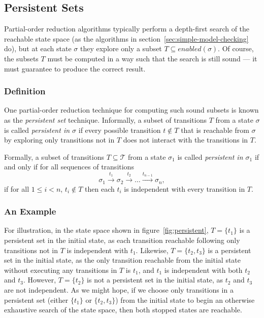 \documentclass[12pt,a4paper,twoside,openright]{report}
\begin{document}
\subsection{Persistent Sets}
\label{sec:persistent}

Partial-order reduction algorithms typically 
perform a depth-first
search of the reachable state space
(as the algorithms in
section~\ref{sec:simple-model-checking} do), but at each
state $\sigma$ they explore only a subset
$T \subseteq \textit{enabled}(\sigma)$. Of course, the subsets
$T$ must be computed in a way such that the search
is still sound --- it must guarantee to
produce the correct result.

\subsubsection{Definition}
One partial-order reduction technique for
computing such sound subsets is known
as the \emph{persistent set} technique. Informally,
a subset of transitions $T$ from a state $\sigma$
is called \emph{persistent in $\sigma$} if every
possible transition $t \not \in T$ that is reachable
from $\sigma$ by exploring only transitions not in
$T$ does not interact with the transitions
in $T$.

Formally, a subset of transitions $T \subseteq \mathcal{T}$
from a state $\sigma_1$
is called \emph{persistent in $\sigma_1$} if and only if
for all sequences of transitions
\[
	\sigma_1 \xrightarrow{\ t_1\ } \sigma_2 \xrightarrow{\ t_2\ } \ldots
	\xrightarrow{t_{n-1}} \sigma_n,
\]
if for all $1 \leq i < n$, $t_i \not \in T$ then each $t_i$ is
independent with every transition in $T$.

\subsubsection{An Example}
For illustration, in the state space shown in
figure~\ref{fig:persistent}, $T = \{t_1\}$ is
a persistent set in the initial state, as each
transition reachable following only transitions
not in $T$ is independent with $t_1$.
Likewise, $T = \{t_2, t_3\}$ is
a persistent set in the initial state, as the
only transition reachable from the initial state
without executing any transitions in $T$ is $t_1$,
and $t_1$ is independent with both $t_2$ and $t_3$.
However, $T = \{t_2\}$ is not a persistent set in the
initial state, as $t_2$ and $t_3$ are not independent.
As we might hope, if we choose only transitions
in a persistent set (either $\{t_1\}$ or $\{t_2, t_3\}$)
from the initial state to begin
an otherwise exhaustive search of the state space, then
both stopped states are reachable.
\end{document}
